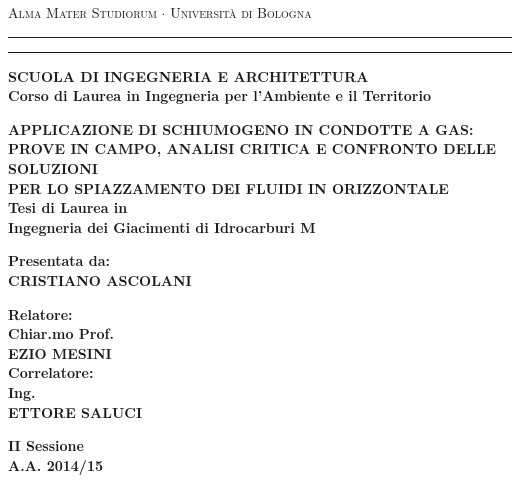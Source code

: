 \begin{titlepage}
\begin{center}
{{\large{\textsc{Alma Mater Studiorum $\cdot$ Universit\`a di
Bologna}}}} \rule[0.1cm]{\textwidth}{0.1mm}
\rule[0.5cm]{\textwidth}{0.6mm}
{\footnotesize{\bf SCUOLA DI INGEGNERIA  E ARCHITETTURA\\
Corso di Laurea in Ingegneria per l'Ambiente e il Territorio}}
\end{center}
\vspace{8mm}
\begin{center}
{\Large{\bf APPLICAZIONE DI SCHIUMOGENO IN CONDOTTE A GAS:}}\\
\vspace{3mm}
{\Large{\bf PROVE IN CAMPO, ANALISI CRITICA E CONFRONTO DELLE SOLUZIONI }}\\
\vspace{3mm}
{\Large{\bf PER LO SPIAZZAMENTO DEI FLUIDI IN ORIZZONTALE}}\\
\vspace{12mm} {\large{\bf Tesi di Laurea in \\Ingegneria dei Giacimenti di Idrocarburi M}}
\end{center}
\vspace{17mm}
\par
\noindent
\begin{minipage}[t]{0.47\textwidth}
{\normalsize{\bf Presentata da:\\
CRISTIANO ASCOLANI}}
\end{minipage}
\hfill
\begin{minipage}[t]{0.47\textwidth}\raggedleft
{\normalsize{\bf Relatore:\\
Chiar.mo Prof. \\EZIO MESINI\\}}
\vspace{5mm}
{\normalsize{\bf Correlatore:\\
Ing.\\ ETTORE SALUCI}}
\end{minipage}
\vspace{15mm}
\begin{center}
{\normalsize{\bf II Sessione\\
A.A. 2014/15}}
\end{center}
\end{titlepage}